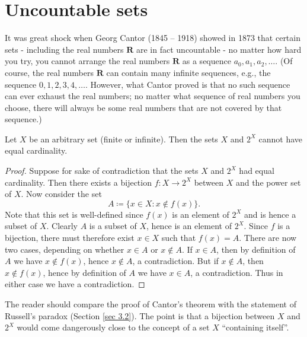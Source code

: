 \section{Uncountable sets}\label{sec 8.3}

\begin{note}
    It was great shock when Georg Cantor (1845 -- 1918) showed in 1873 that certain sets
    - including the real numbers \(\mathbf{R}\) are in fact uncountable -
    no matter how hard you try, you cannot arrange the real numbers \(\mathbf{R}\) as a sequence \(a_0, a_1, a_2, \dots\).
    (Of course, the real numbers \(\mathbf{R}\) can contain many infinite sequences, e.g., the sequence \(0, 1, 2, 3, 4, \dots\).
    However, what Cantor proved is that no such sequence can ever exhaust the real numbers;
    no matter what sequence of real numbers you choose, there will always be some real numbers that are not covered by that sequence.)
\end{note}

\begin{theorem}\label{8.3.1}
    Let \(X\) be an arbitrary set (finite or infinite).
    Then the sets \(X\) and \(2^X\) cannot have equal cardinality.
\end{theorem}

\begin{proof}
    Suppose for sake of contradiction that the sets \(X\) and \(2^X\) had equal cardinality.
    Then there exists a bijection \(f : X \to 2^X\) between \(X\) and the power set of \(X\).
    Now consider the set
    \[
        A \coloneqq \{x \in X : x \notin f(x)\}.
    \]
    Note that this set is well-defined since \(f(x)\) is an element of \(2^X\) and is hence a subset of \(X\).
    Clearly \(A\) is a subset of \(X\), hence is an element of \(2^X\).
    Since \(f\) is a bijection, there must therefore exist \(x \in X\) such that \(f(x) = A\).
    There are now two cases, depending on whether \(x \in A\) or \(x \notin A\).
    If \(x \in A\), then by definition of \(A\) we have \(x \notin f(x)\), hence \(x \notin A\), a contradiction.
    But if \(x \notin A\), then \(x \notin f(x)\), hence by definition of \(A\) we have \(x \in A\), a contradiction.
    Thus in either case we have a contradiction.
\end{proof}

\begin{remark}\label{8.3.2}
    The reader should compare the proof of Cantor's theorem with the statement of Russell's paradox (Section \ref{sec 3.2}).
    The point is that a bijection between \(X\) and \(2^X\) would come dangerously close to the concept of a set \(X\) ``containing itself''.
\end{remark}

